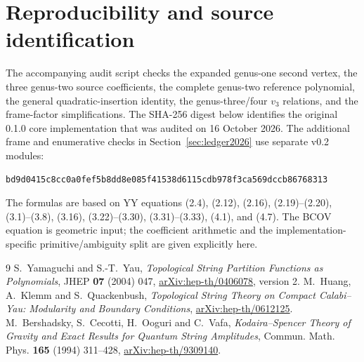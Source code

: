 \documentclass[11pt,a4paper]{article}
\numberwithin{equation}{section}
\newcommand{\code}[1]{\texttt{\detokenize{#1}}}
\begin{document}
\section{Reproducibility and source identification}
The accompanying audit script \code{verify_bcov_notes.py} checks the expanded
genus-one second vertex, the three genus-two source coefficients, the complete
genus-two reference polynomial, the general quadratic-insertion identity,
the genus-three/four $v_3$ relations, and the frame-factor simplifications.
The SHA-256 digest below identifies the original 0.1.0 core implementation
that was audited on 16 October 2026. The additional frame and enumerative
checks in Section~\ref{sec:ledger2026} use separate v0.2 modules:
\begin{center}\small\texttt{bd9d0415c8cc0a0fef5b8dd8e085f41538d6115cdb978f3ca569dccb86768313}\end{center}

The formulas are based on YY equations (2.4), (2.12), (2.16), (2.19)--(2.20),
(3.1)--(3.8), (3.16), (3.22)--(3.30), (3.31)--(3.33), (4.1), and (4.7).
The BCOV equation is geometric input; the coefficient arithmetic and the
implementation-specific primitive/ambiguity split are given explicitly here.

\begin{thebibliography}{9}
 S.~Yamaguchi and S.-T.~Yau,
\emph{Topological String Partition Functions as Polynomials},
JHEP \textbf{07} (2004) 047,
\href{https://arxiv.org/abs/hep-th/0406078}{arXiv:hep-th/0406078}, version 2.
 M.~Huang, A.~Klemm and S.~Quackenbush,
\emph{Topological String Theory on Compact Calabi--Yau: Modularity and Boundary Conditions},
\href{https://arxiv.org/abs/hep-th/0612125}{arXiv:hep-th/0612125}.
 M.~Bershadsky, S.~Cecotti, H.~Ooguri and C.~Vafa,
\emph{Kodaira--Spencer Theory of Gravity and Exact Results for Quantum String Amplitudes},
Commun. Math. Phys. \textbf{165} (1994) 311--428,
\href{https://arxiv.org/abs/hep-th/9309140}{arXiv:hep-th/9309140}.
\end{thebibliography}
\end{document}
